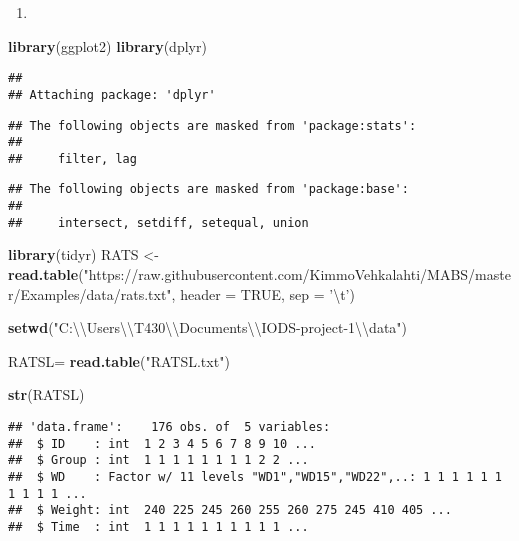 \documentclass[]{article}
\title{}
\author{}
\date{}
\newenvironment{Shaded}{\begin{snugshade}}{\end{snugshade}}
\newcommand{\CharTok}[1]{\textcolor[rgb]{0.31,0.60,0.02}{#1}}
\newcommand{\DataTypeTok}[1]{\textcolor[rgb]{0.13,0.29,0.53}{#1}}
\newcommand{\KeywordTok}[1]{\textcolor[rgb]{0.13,0.29,0.53}{\textbf{#1}}}
\newcommand{\NormalTok}[1]{#1}
\newcommand{\OtherTok}[1]{\textcolor[rgb]{0.56,0.35,0.01}{#1}}
\newcommand{\StringTok}[1]{\textcolor[rgb]{0.31,0.60,0.02}{#1}}
\begin{document}
\begin{enumerate}
\def\labelenumi{\arabic{enumi}.}
\item
\end{enumerate}

\begin{Shaded}
\begin{Highlighting}[]
\KeywordTok{library}\NormalTok{(ggplot2)}
\KeywordTok{library}\NormalTok{(dplyr)}
\end{Highlighting}
\end{Shaded}

\begin{verbatim}
## 
## Attaching package: 'dplyr'
\end{verbatim}

\begin{verbatim}
## The following objects are masked from 'package:stats':
## 
##     filter, lag
\end{verbatim}

\begin{verbatim}
## The following objects are masked from 'package:base':
## 
##     intersect, setdiff, setequal, union
\end{verbatim}

\begin{Shaded}
\begin{Highlighting}[]
\KeywordTok{library}\NormalTok{(tidyr)}
\NormalTok{RATS <-}\StringTok{ }\KeywordTok{read.table}\NormalTok{(}\StringTok{"https://raw.githubusercontent.com/KimmoVehkalahti/MABS/master/Examples/data/rats.txt"}\NormalTok{, }\DataTypeTok{header =} \OtherTok{TRUE}\NormalTok{, }\DataTypeTok{sep =} \StringTok{'}\CharTok{\textbackslash{}t}\StringTok{'}\NormalTok{)}


\KeywordTok{setwd}\NormalTok{(}\StringTok{"C:}\CharTok{\textbackslash{}\textbackslash{}}\StringTok{Users}\CharTok{\textbackslash{}\textbackslash{}}\StringTok{T430}\CharTok{\textbackslash{}\textbackslash{}}\StringTok{Documents}\CharTok{\textbackslash{}\textbackslash{}}\StringTok{IODS-project-1}\CharTok{\textbackslash{}\textbackslash{}}\StringTok{data"}\NormalTok{)}

\NormalTok{RATSL=}\StringTok{ }\KeywordTok{read.table}\NormalTok{(}\StringTok{"RATSL.txt"}\NormalTok{)}


\KeywordTok{str}\NormalTok{(RATSL)}
\end{Highlighting}
\end{Shaded}

\begin{verbatim}
## 'data.frame':    176 obs. of  5 variables:
##  $ ID    : int  1 2 3 4 5 6 7 8 9 10 ...
##  $ Group : int  1 1 1 1 1 1 1 1 2 2 ...
##  $ WD    : Factor w/ 11 levels "WD1","WD15","WD22",..: 1 1 1 1 1 1 1 1 1 1 ...
##  $ Weight: int  240 225 245 260 255 260 275 245 410 405 ...
##  $ Time  : int  1 1 1 1 1 1 1 1 1 1 ...
\end{verbatim}
\end{document}
